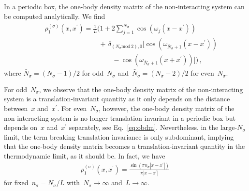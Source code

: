 \documentclass[pra,aps,groupedaddress,floatfix,twocolumn,superscriptaddress,showpacs,nofootinbib]{revtex4-1}
\newcommand{\nn}{\nonumber }
\newcommand{\be}{\begin{eqnarray}}
\newcommand{\ee}{\end{eqnarray}}
\begin{document}
{In a periodic box, the one-body density matrix of the non-interacting system
can be computed analytically. We find
%
\be
&& \rho_1^{(\sigma)}(x,x^{\prime}) = \frac{1}{L}\Bigg( 1 + 2\sum_{j=1}^{\bar{N}_{\sigma}}\cos\left(\omega_j(x-x^{\prime})\right) \nn\\
&& \qquad\qquad\qquad\qquad +\, \delta_{(N_{\sigma}\text{mod}\, 2), 0} \Big[ \cos \left(\omega_{\bar{N}_{\sigma}+1}(x-x^{\prime})\right) \nn\\
&&  \qquad\qquad\qquad\qquad\qquad - \cos \left(\omega_{\bar{N}_{\sigma}+1}(x+x^{\prime})\right)
\Big] \Bigg)\,,\label{eq:obdm}
\ee
%
where $\bar{N}_{\sigma}=(N_{\sigma}-1)/2$ for odd~$N_{\sigma}$ and~$\bar{N}_{\sigma}=(N_{\sigma}-2)/2$ for
even~$N_{\sigma}$.

For odd~$N_{\sigma}$, we observe that the one-body density matrix
of the non-interacting system is a translation-invariant quantity as it only
depends on the distance between~$x$ and~$x^{\prime}$. For even~$N_{\sigma}$, however,
the one-body density matrix of the non-interacting system is no longer
translation-invariant in a periodic box but depends on~$x$ and~$x^{\prime}$ separately, see Eq.~\eqref{eq:obdm}.
Nevertheless, in the large-$N_{\sigma}$ limit, the term breaking translation invariance is only subdominant, implying
that the one-body density matrix becomes a translation-invariant quantity in the thermodynamic
limit, as it should be. In fact, we have
%
\be
 \rho_1^{(\sigma)}(x,x^{\prime}) = \frac{\sin \left(\pi n_{\sigma} |x-x^{\prime}|\right)}{\pi |x-x^{\prime}|}\,
 \label{eq:rho1free}
\ee
%
{for fixed~$n_{\sigma}=N_{\sigma}/L$ with~$N_{\sigma}\to\infty$ and~$L\to \infty$}.

}
\end{document}
